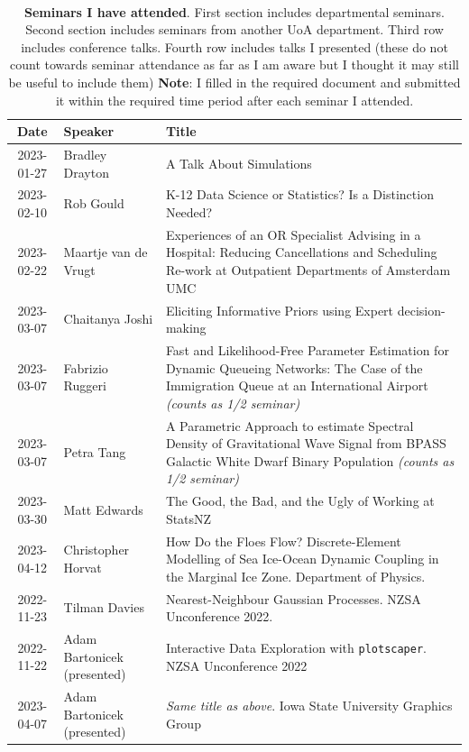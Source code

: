 \documentclass[12pt,a4paper]{article}
\begin{document}
\begin{table}[H]
\caption{
\textbf{Seminars I have attended}.
First section includes departmental seminars.
Second section includes seminars from another UoA department.
Third row includes conference talks.
Fourth row includes talks I presented (these do not count towards seminar attendance as far as I am aware but I thought it may still be useful to include them) \newline
\textbf{Note}:
I filled in the required document and submitted it within the required time period after each seminar I attended.
}
\centering
\ ~~~~ \\
\label{tab:seminars}
\begin{tabular}{|c|l|p{10cm}|}
\hline
Date & Speaker & Title \\
\hline
2023-01-27 & Bradley Drayton &
A Talk About Simulations \\
%
2023-02-10 & Rob Gould &
K-12 Data Science or Statistics? Is a Distinction Needed? \\
%
2023-02-22 & Maartje van de Vrugt &
Experiences of an OR Specialist Advising in a Hospital: Reducing Cancellations and
Scheduling Re-work at Outpatient Departments of Amsterdam UMC \\
%
2023-03-07 & Chaitanya Joshi &
Eliciting Informative Priors using Expert decision-making \\
%
2023-03-07 & Fabrizio Ruggeri &
Fast and Likelihood-Free Parameter Estimation for Dynamic Queueing Networks: The
Case of the Immigration Queue at an International Airport \textit{(counts as 1/2 seminar)} \\
%
2023-03-07 & Petra Tang &
A Parametric Approach to estimate Spectral Density of Gravitational Wave Signal from
BPASS Galactic White Dwarf Binary Population \textit{(counts as 1/2 seminar)} \\
%
2023-03-30 & Matt Edwards &
The Good, the Bad, and the Ugly of Working at StatsNZ \\
\hline

2023-04-12 & Christopher Horvat &
How Do the Floes Flow? Discrete-Element Modelling of Sea Ice-Ocean Dynamic Coupling in the Marginal Ice Zone. \newline Department of Physics. \\

\hline

2022-11-23 & Tilman Davies & Nearest-Neighbour Gaussian Processes. \newline NZSA Unconference 2022. \\

\hline
%
2022-11-22 & Adam Bartonicek (presented) & Interactive Data Exploration with \texttt{plotscaper}. \newline NZSA Unconference 2022 \\
%
2023-04-07 & Adam Bartonicek (presented) & \textit{Same title as above}. \newline Iowa State University Graphics Group \\

\hline

\end{tabular}
\end{table}
\end{document}
